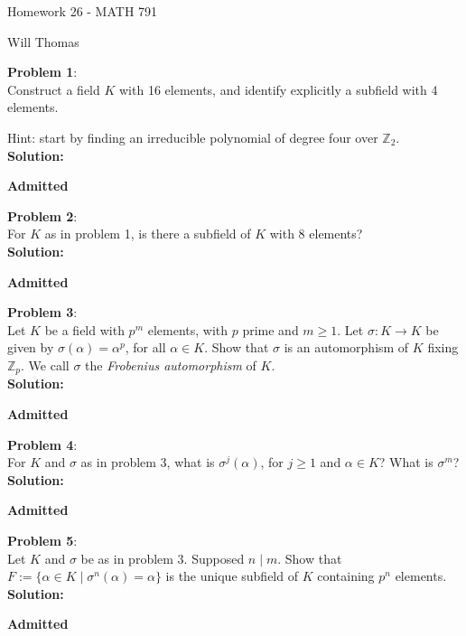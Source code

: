 \documentclass[11pt]{article}
\newcommand{\prob}[3]{\begin{flushleft}
        \textbf{Problem #1}: \\
        #2 
		\textbf{Solution:} 
		#3

\end{flushleft}}
\newcommand{\admit}{
  \begin{flushright}
    \textbf{Admitted}
  \end{flushright}
}
\newcommand{\makeHWtitle}[1]{
    \begin{center}
    \Large{Homework #1 - MATH 791} 
        \vspace{5pt}
        
        \normalsize{Will Thomas}
        \vspace{5pt}
    \end{center}
}
\begin{document}
\makeHWtitle{26}

\prob{1}{
  Construct a field $K$ with 16 elements, and identify explicitly a subfield with 4 elements.

  Hint: start by finding an irreducible polynomial of degree four over $\mathbb{Z}_2$. \\
}{ \\
  \admit
}

\prob{2}{
  For $K$ as in problem 1, is there a subfield of $K$ with 8 elements? \\
}{\\
  \admit
}

\prob{3}{
  Let $K$ be a field with $p^m$ elements, with $p$ prime and $m \geq 1$.
  Let $\sigma : K \rightarrow K$ be given by $\sigma(\alpha) = \alpha^p$, for all $\alpha \in K$.
  Show that $\sigma$ is an automorphism of $K$ fixing $\mathbb{Z}_p$.
  We call $\sigma$ the \emph{Frobenius automorphism} of $K$. \\
}{\\
  \admit
}

\prob{4}{
  For $K$ and $\sigma$ as in problem 3, what is $\sigma^j(\alpha)$, for $j \geq 1$ and $\alpha \in K$?
  What is $\sigma^m$? \\
}{\\
  \admit
}

\prob{5}{
  Let $K$ and $\sigma$ be as in problem 3. Supposed $n \mid m$. Show that $F := \{ \alpha \in K \mid \sigma^n(\alpha) = \alpha \}$ is the unique subfield of $K$ containing $p^n$ elements.\\
}{\\
  \admit
}
\end{document}
